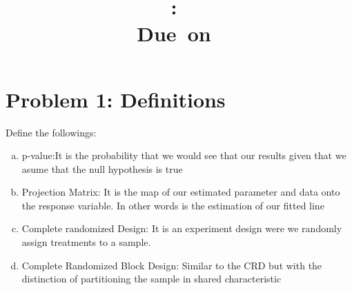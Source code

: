 \documentclass{article}
\title{
	\vspace{2in}
	\textmd{\textbf{\hmwkClass:\ \hmwkTitle}}\\
	\normalsize\vspace{0.1in}\small{Due\ on\ \hmwkDueDate}\\
	\vspace{0.1in}\large{\textit{\hmwkClassInstructor}}
	\vspace{3in}
}
\author{\hmwkAuthorName}
\date{}
\begin{document}
\maketitle
\pagebreak
\tableofcontents
\pagebreak

\section*{Problem 1: Definitions}
Define the followings:
\begin{enumerate}[(a)]
	\item p-value:It is the probability that we would see that our results given that we asume that the null hypothesis is true
	\item Projection Matrix: It is the map of our estimated parameter and data onto the response variable. In other words is the
	      estimation of our fitted line
	\item Complete randomized Design: It is an experiment design were we randomly assign treatments to a sample.
	\item Complete Randomized Block Design: Similar to the CRD but with the distinction of partitioning the sample in shared characteristic

\end{enumerate}
\end{document}
